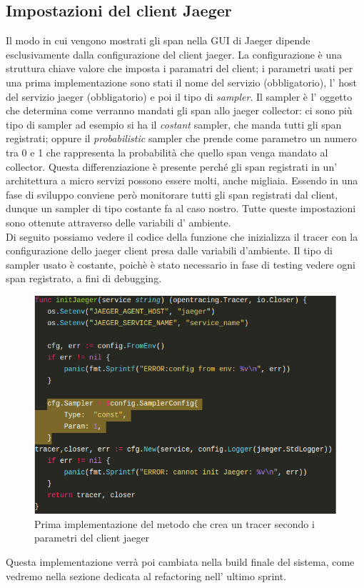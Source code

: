 \documentclass[a4paper,12pt,titlepage,italian,openany]{report}
\begin{document}
\subsection{Impostazioni del client Jaeger}
Il modo in cui vengono mostrati gli span nella GUI di Jaeger dipende esclusivamente dalla configurazione del client jaeger.
La configurazione è una struttura chiave valore che imposta i paramatri del client; i parametri usati per una prima implementazione sono stati il nome del servizio (obbligatorio), l' host del servizio jaeger (obbligatorio) e poi il tipo di \textit{sampler}. Il sampler è l' oggetto che determina come verranno mandati gli span allo jaeger collector:
ci sono più tipo di sampler ad esempio si ha il \textit{costant} sampler, che manda tutti gli span registrati; oppure il \textit{probabilistic} sampler che prende come parametro un numero tra 0 e 1 che rappresenta la probabilità che quello span venga mandato al collector. Questa differenziazione è presente perché gli span registrati in un' architettura a micro servizi possono essere molti, anche migliaia. Essendo in una fase di sviluppo conviene però monitorare tutti gli span registrati dal client, dunque un sampler di tipo costante fa al caso nostro.
Tutte queste impostazioni sono ottenute attraverso delle variabili d' ambiente.
\\ Di seguito possiamo vedere il codice della funzione che inizializza il tracer con la configurazione dello jaeger client presa dalle variabili d'ambiente.
Il tipo di sampler usato è costante, poichè è stato necessario in fase di testing vedere ogni span registrato, a fini di debugging.
\begin{figure}[H]
    \includegraphics[scale=0.5]{92.png}
    \centering
    \caption{Prima implementazione del metodo che crea un tracer secondo i parametri del client jaeger}
\end{figure}  
Questa implementazione verrà poi cambiata nella build finale del sistema, come vedremo nella sezione dedicata al refactoring nell' ultimo sprint.
\end{document}
